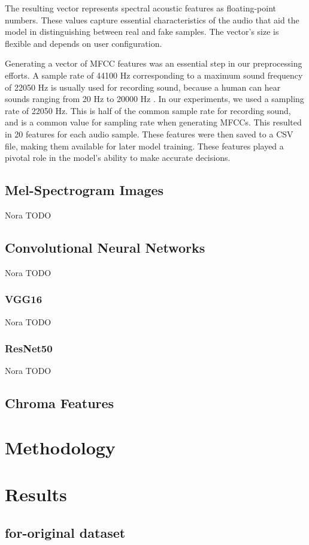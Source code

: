 \documentclass[sigconf,authordraft]{acmart}
\begin{document}
The resulting vector represents spectral acoustic features as floating-point numbers. These values capture essential characteristics of the audio that aid the model in distinguishing between real and fake samples. The vector's size is flexible and depends on user configuration. 

Generating a vector of MFCC features was an essential step in our preprocessing efforts. A sample rate of 44100 Hz corresponding to a maximum sound frequency of 22050 Hz is usually used for recording sound, because a human can hear sounds ranging from 20 Hz to 20000 Hz \cite{9252126}. In our experiments, we used a sampling rate of 22050 Hz. This is half of the common sample rate for recording sound, and is a common value for sampling rate when generating MFCCs. This resulted in 20 features for each audio sample. These features were then saved to a CSV file, making them available for later model training. These features played a pivotal role in the model's ability to make accurate decisions.

\subsection{Mel-Spectrogram Images}
Nora TODO
\subsection{Convolutional Neural Networks}
Nora TODO
\subsubsection{VGG16}
Nora TODO
\subsubsection{ResNet50}
Nora TODO

\subsection{Chroma Features}

\section{Methodology}

\section{Results}

\subsection{for-original dataset}
\end{document}
